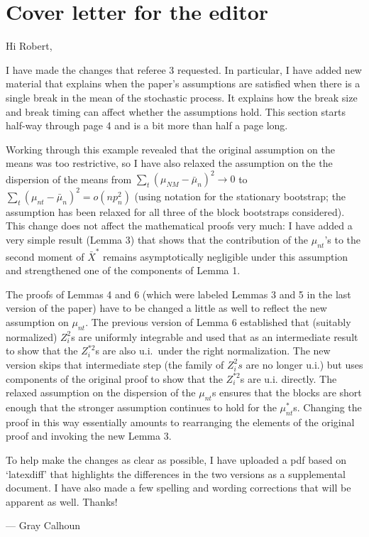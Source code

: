 \documentclass[12pt]{article}
\begin{document}
\section*{\hfill Cover letter for the editor\hfill}

Hi Robert,

I have made the changes that referee 3 requested. In particular, I
have added new material that explains when the paper's assumptions are
satisfied when there is a single break in the mean of the stochastic
process. It explains how the break size and break timing can affect
whether the assumptions hold. This section starts half-way through
page 4 and is a bit more than half a page long.

Working through this example revealed that the original assumption
on the means was too restrictive, so I have also relaxed the
assumption on the the dispersion of the means from
$\sum_t (\mu_{NM} - \bar \mu_n)^2 \to 0$ to
$\sum_t (\mu_{nt} - \bar \mu_n)^2 = o(n p_n^2)$ (using notation for
the stationary bootstrap; the assumption has been relaxed for all
three of the block bootstraps considered).  This change does not
affect the mathematical proofs very much: I have added a very simple
result (Lemma 3) that shows that the contribution of the $\mu_{nt}$'s to the
second moment of $\bar X^*$ remains asymptotically negligible under
this assumption and strengthened one of the components of Lemma 1.

The proofs of Lemmas 4 and 6 (which were labeled Lemmas 3 and 5 in the
last version of the paper) have to be changed a little as well to
reflect the new assumption on $\mu_{nt}$. The previous version of
Lemma 6 established that (suitably normalized) $Z_i^2$s are uniformly
integrable and used that as an intermediate result to show that the
$Z_i^{*2}$s are also u.i.\ under the right normalization. The new
version skips that intermediate step (the family of $Z_i^2s$ are no
longer u.i.) but uses components of the original proof to show that
the $Z_i^{*2}$s are u.i. directly. The relaxed assumption on the
dispersion of the $\mu_{nt}$s ensures that the blocks are short
enough that the stronger assumption continues to hold for the
$\mu_{nt}^*$s.
Changing the proof in this way essentially amounts to rearranging the
elements of the original proof and invoking the new Lemma 3.

To help make the changes as clear as possible, I have uploaded a
pdf based on `latexdiff' that highlights the differences in the
two versions as a supplemental document. I have also made a few
spelling and wording corrections that will be apparent as well.
Thanks!

\strut

\noindent --- Gray Calhoun
\end{document}
